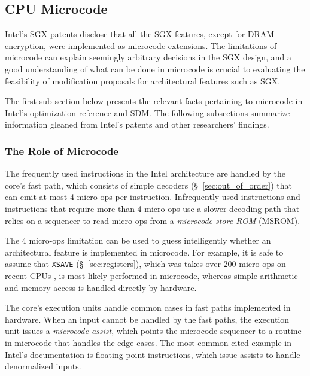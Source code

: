 \subsection{CPU Microcode}
\label{sec:microcode}

Intel's SGX patents disclose that all the SGX features, except for DRAM
encryption, were implemented as microcode extensions. The limitations of
microcode can explain seemingly arbitrary decisions in the SGX design, and a
good understanding of what can be done in microcode is crucial to evaluating
the feasibility of modification proposals for architectural features such as
SGX.

The first sub-section below presents the relevant facts pertaining to microcode
in Intel's optimization reference \cite{intel2014optimization} and SDM. The
following subsections summarize information gleaned from Intel's patents and
other researchers' findings.


\subsubsection{The Role of Microcode}
\label{sec:microcode_role}


The frequently used instructions in the Intel architecture are handled by the
core's fast path, which consists of simple decoders (\S~\ref{sec:out_of_order})
that can emit at most 4 micro-ops per instruction. Infrequently used
instructions and instructions that require more than 4 micro-ops use a slower
decoding path that relies on a sequencer to read micro-ops from a
\textit{microcode store ROM} (MSROM).

The 4 micro-ops limitation can be used to guess intelligently whether an
architectural feature is implemented in microcode. For example, it is safe to
assume that \texttt{XSAVE} (\S~\ref{sec:registers}), which was takes over 200
micro-ops on recent CPUs \cite{fog2014microops}, is most likely performed in
microcode, whereas simple arithmetic and memory access is handled directly by
hardware.


The core's execution units handle common cases in fast paths implemented in
hardware. When an input cannot be handled by the fast paths, the execution
unit issues a \textit{microcode assist}, which points the microcode sequencer
to a routine in microcode that handles the edge cases. The most common cited
example in Intel's documentation is floating point instructions, which issue
assists to handle denormalized inputs.

